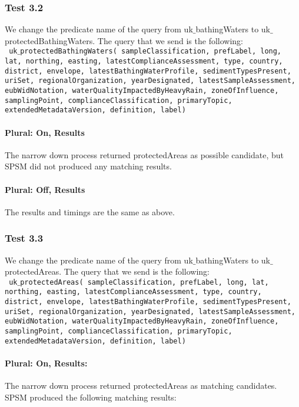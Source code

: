 \documentclass[a4paper,10pt]{article}
\begin{document}
\subsubsection{Test 3.2}
We change the predicate name of the query from uk$\_$bathingWaters  to uk$\_$protectedBathingWaters. The query that we send is the following:\\
\indent \texttt{ uk$\_$protectedBathingWaters( sampleClassification, prefLabel, long, lat, northing, easting,  latestComplianceAssessment, type, country, district,  envelope, latestBathingWaterProfile, sedimentTypesPresent, uriSet, regionalOrganization, yearDesignated, latestSampleAssessment, eubWidNotation, waterQualityImpactedByHeavyRain, zoneOfInfluence, samplingPoint, complianceClassification, primaryTopic, extendedMetadataVersion, definition, label)}

\paragraph{Plural: On, Results} The narrow down process returned protectedAreas as possible candidate, but SPSM did not produced any matching results.
\paragraph{Plural: Off, Results} The results and timings are the same as above.


\subsubsection{Test 3.3}

We change the predicate name of the query from uk$\_$bathingWaters to uk$\_$protectedAreas. The query that we send is the following: \\
\indent \texttt{ uk$\_$protectedAreas( sampleClassification, prefLabel, long, lat, northing, easting,  latestComplianceAssessment, type, country, district,  envelope, latestBathingWaterProfile, sedimentTypesPresent, uriSet, regionalOrganization, yearDesignated, latestSampleAssessment, eubWidNotation, waterQualityImpactedByHeavyRain, zoneOfInfluence, samplingPoint, complianceClassification, primaryTopic, extendedMetadataVersion, definition, label)}


\paragraph{Plural: On, Results: } The narrow down process returned protectedAreas as matching candidates. SPSM produced the following matching results: 
\end{document}
